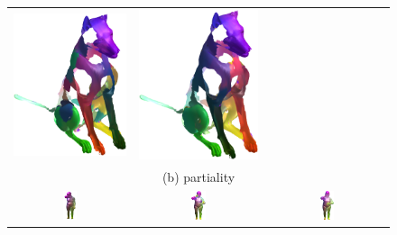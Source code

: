 \begin{figure}[b!]
\begin{tabular}{ccc}
		\includegraphics[scale=0.55]{figures/holes_dog_shape_25_PFM.png}&
		\includegraphics[scale=0.55]{figures/holes_dog_shape_25.png}\\
		\multicolumn{3}{c}{(b) partiality}\\
		\includegraphics[width=0.12\textwidth]{figures/Top1Base.png} &
		\includegraphics[width=0.12\textwidth]{figures/Top1PFM.png} &
		\includegraphics[width=0.12\textwidth]{figures/Top1DDIS.png} \\

\end{tabular}
\end{figure}
